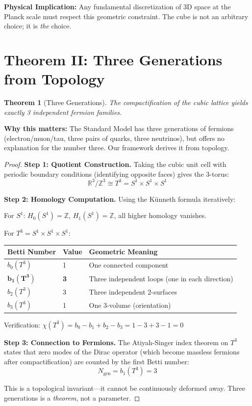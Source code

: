 \documentclass[11pt,a4paper]{article}
\theoremstyle{plain}
\newtheorem{theorem}{Theorem}[section]
\theoremstyle{definition}
\theoremstyle{remark}
\newcommand{\Ngen}{N_{\text{gen}}}
\begin{document}
\textbf{Physical Implication:} Any fundamental discretization of 3D space at the Planck scale must respect this geometric constraint. The cube is not an arbitrary choice; it is \emph{the} choice.

\section{Theorem II: Three Generations from Topology}

\begin{theorem}[Three Generations]
The compactification of the cubic lattice yields exactly 3 independent fermion families.
\end{theorem}

\textbf{Why this matters:} The Standard Model has three generations of fermions (electron/muon/tau, three pairs of quarks, three neutrinos), but offers no explanation for the number three. Our framework derives it from topology.

\begin{proof}
\textbf{Step 1: Quotient Construction.} Taking the cubic unit cell with periodic boundary conditions (identifying opposite faces) gives the 3-torus:
\[
\mathbb{R}^3/\mathbb{Z}^3 \cong T^3 = S^1 \times S^1 \times S^1
\]

\textbf{Step 2: Homology Computation.} Using the K\"unneth formula iteratively:

For $S^1$: $H_0(S^1) = \mathbb{Z}$, $H_1(S^1) = \mathbb{Z}$, all higher homology vanishes.

For $T^3 = S^1 \times S^1 \times S^1$:

\begin{center}
\begin{tabular}{lll}
\toprule
\textbf{Betti Number} & \textbf{Value} & \textbf{Geometric Meaning} \\
\midrule
$b_0(T^3)$ & 1 & One connected component \\
$\mathbf{b_1(T^3)}$ & \textbf{3} & Three independent loops (one in each direction) \\
$b_2(T^3)$ & 3 & Three independent 2-surfaces \\
$b_3(T^3)$ & 1 & One 3-volume (orientation) \\
\bottomrule
\end{tabular}
\end{center}

Verification: $\chi(T^3) = b_0 - b_1 + b_2 - b_3 = 1 - 3 + 3 - 1 = 0$ \checkmark

\textbf{Step 3: Connection to Fermions.} The Atiyah-Singer index theorem on $T^3$ states that zero modes of the Dirac operator (which become massless fermions after compactification) are counted by the first Betti number:
\[
\Ngen = b_1(T^3) = 3
\]

This is a topological invariant---it cannot be continuously deformed away. Three generations is a \emph{theorem}, not a parameter.
\end{proof}
\end{document}
